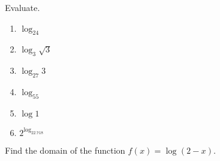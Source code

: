 \iffalse
\begin{exercise}
Write each equation into equivalent logarithmic form.\\

\noindent
\begin{enumerate*}[label=(\alph*)~~]
\item  $7^x=10$ \hspace{0.4\textwidth}
\item  $b^5=2$
\end{enumerate*}
\end{exercise}
\fi


\begin{exercise}
Evaluate.
\begin{enumerate}[label=(\arabic*)~~,itemsep=1cm]
\item  $\log_24$
\item  $\log_3\sqrt{3}$
\item  $\log_{27}3$
\item  $\log_55$ 
\item  $\log 1$
\item $2^{\log_22.718}$ 
\end{enumerate}
\end{exercise}



\iffalse
\begin{exercise}
Evaluate.
\begin{enumerate}[label=(\arabic*)~~, itemsep=1cm]
\item  $\log_216$
\item  $\log_93$
\item  $\log_{27}3$
\item  $\log 10$ 
\item  $\ln 1$ 
\item $e^{\ln 2}$
\item $\log 10^{\frac13}$
\end{enumerate}
\end{exercise}
\fi



\begin{exercise}Find the domain of the function $f(x)=\log(2-x)$.
\end{exercise}

\vspace{1cm}


